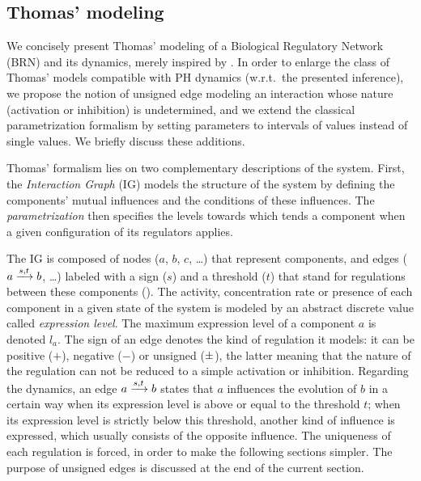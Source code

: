 \subsection{Thomas' modeling}

We concisely present Thomas' modeling of a Biological Regulatory Network (BRN) and its dynamics, merely inspired by
\cite{Richard06,BernotSemBRN}.
In order to enlarge the class of Thomas' models compatible with PH dynamics (w.r.t.~the presented
inference),
we propose the notion of unsigned edge modeling an interaction whose nature (activation or inhibition) is undetermined,
and we extend the classical parametrization formalism by setting parameters to intervals of values instead of single values.
We briefly discuss these additions.

Thomas' formalism lies on two complementary descriptions of the system. First, the
\emph{Interaction Graph} (IG) models the structure of the system by defining the components'
mutual influences and the conditions of these influences.
The \emph{parametrization} then specifies the levels towards which tends a component when a given
configuration of its regulators applies.

The IG is composed of nodes ($a$, $b$, $c$, …) that represent components,
and edges ($a \xrightarrow{s, t} b$, …) labeled with a sign ($s$) and a threshold ($t$) that stand for regulations between these components ().
The activity, concentration rate or presence of each component in a given state of the system is modeled by an abstract discrete value called \emph{expression level}.
The maximum expression level of a component $a$ is denoted $l_a$.
The sign of an edge denotes the kind of regulation it models: it can be positive ($+$), negative ($-$) or unsigned ($\pm$),
the latter meaning that the nature of the regulation can not be reduced to a simple activation or inhibition.
Regarding the dynamics, an edge $a \xrightarrow{s, t} b$ states that $a$ influences the evolution of $b$ in a certain way when its expression level is above or equal to the threshold $t$;
when its expression level is strictly below this threshold, another kind of influence is expressed, which usually consists of the opposite influence.
The uniqueness of each regulation is forced, in order to make the following sections simpler.
The purpose of unsigned edges is discussed at the end of the current section.

